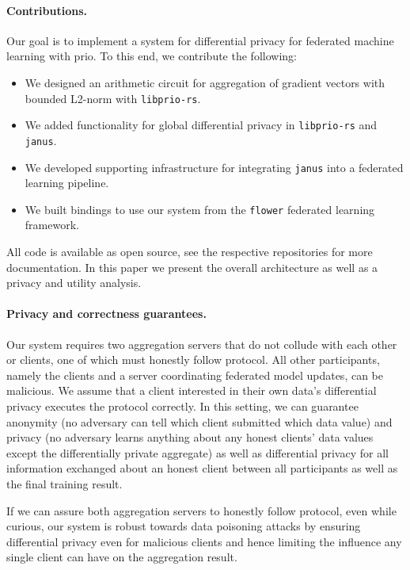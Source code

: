 \documentclass{article}
\begin{document}
\paragraph{Contributions.}
Our goal is to implement a system for differential privacy for federated
machine learning with prio. To this end, we contribute the following:
\begin{itemize}
  \setlength\itemsep{0em}
\item We designed an arithmetic circuit for aggregation of gradient vectors with
  bounded L2-norm with \texttt{libprio-rs}.
\item We added functionality for global differential privacy in
  \texttt{libprio-rs} and \texttt{janus}.
\item We developed supporting infrastructure for integrating \texttt{janus} into
  a federated learning pipeline.
\item We built bindings to use our system from the \texttt{flower} federated
  learning framework.
\end{itemize}
All code is available as open source, see the respective repositories for more
documentation. In this paper we present the overall architecture as well as a
privacy and utility analysis.

\paragraph{Privacy and correctness guarantees.}
Our system requires two aggregation servers that do not collude with each other or clients, one of which must honestly follow protocol. All other participants, namely the clients and a server coordinating federated model updates, can be malicious. We assume that a client interested in their own data's differential privacy executes the protocol correctly. In this setting, we can guarantee anonymity (no adversary can tell which client submitted which data value) and privacy (no adversary learns anything about any honest clients' data values except the differentially private aggregate) as well as differential privacy for all information exchanged about an honest client between all participants as well as the final training result.

If we can assure both aggregation servers to honestly follow protocol, even while curious, our system is robust towards data poisoning attacks by ensuring differential privacy even for malicious clients and hence limiting the influence any single client can have on the aggregation result.
\end{document}
